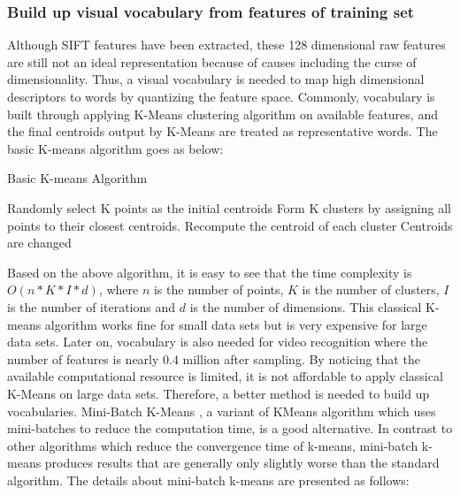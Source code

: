 \subsubsection{Build up visual vocabulary from features of training set}
Although SIFT features have been extracted, these 128 dimensional raw features are still not an ideal representation because of causes including the curse of dimensionality. Thus, a visual vocabulary is needed to map high dimensional descriptors to words by quantizing the feature space. Commonly, vocabulary is built through applying K-Means \cite{lloyd1982least} clustering algorithm on available features, and the final centroids output by K-Means are treated as representative words. The basic K-means algorithm goes as below:

\begin{algorithm}
  \caption{Basic K-means Algorithm}
  \begin {algorithmic}[1]
  \State Randomly select K points as the initial centroids
  \Do 
    \State Form K clusters by assigning all points to their closest centroids.
    \State Recompute the centroid of each cluster
  \doWhile Centroids are changed
  \end{algorithmic}
\end{algorithm}

\noindent Based on the above algorithm, it is easy to see that the time complexity is $O(n*K*I*d)$, where $n$ is the number of points, $K$ is the number of clusters, $I$ is the number of iterations and $d$ is the number of dimensions. This classical K-means algorithm works fine for small data sets but is very expensive for large data sets. Later on, vocabulary is also needed for video recognition where the number of features is nearly 0.4 million after sampling. By noticing that the available computational resource is limited, it is not affordable to apply classical K-Means on large data sets. Therefore, a better method is needed to build up vocabularies.  Mini-Batch K-Means \cite{sculley2010web}, a variant of KMeans algorithm which uses mini-batches to reduce the computation time, is a good alternative. In contrast to other algorithms which reduce the convergence time of k-means, mini-batch k-means produces results that are generally only slightly worse than the standard algorithm. The details about mini-batch k-means are presented as follows:

